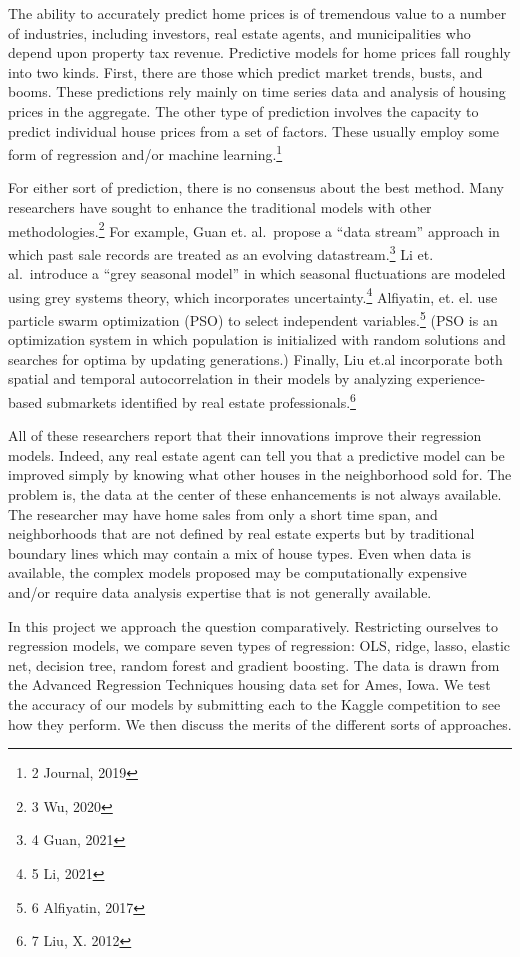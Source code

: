 \documentclass[
]{article}
\begin{document}
The ability to accurately predict home prices is of tremendous value to
a number of industries, including investors, real estate agents, and
municipalities who depend upon property tax revenue. Predictive models
for home prices fall roughly into two kinds. First, there are those
which predict market trends, busts, and booms. These predictions rely
mainly on time series data and analysis of housing prices in the
aggregate. The other type of prediction involves the capacity to predict
individual house prices from a set of factors. These usually employ some
form of regression and/or machine learning.\footnote{2 Journal, 2019}

For either sort of prediction, there is no consensus about the best
method. Many researchers have sought to enhance the traditional models
with other methodologies.\footnote{3 Wu, 2020} For example, Guan et.
al.~propose a ``data stream'' approach in which past sale records are
treated as an evolving datastream.\footnote{4 Guan, 2021} Li et.
al.~introduce a ``grey seasonal model'' in which seasonal fluctuations
are modeled using grey systems theory, which incorporates
uncertainty.\footnote{5 Li, 2021} Alfiyatin, et. el. use particle swarm
optimization (PSO) to select independent variables.\footnote{6
  Alfiyatin, 2017} (PSO is an optimization system in which population is
initialized with random solutions and searches for optima by updating
generations.) Finally, Liu et.al incorporate both spatial and temporal
autocorrelation in their models by analyzing experience-based submarkets
identified by real estate professionals.\footnote{7 Liu, X. 2012}

All of these researchers report that their innovations improve their
regression models. Indeed, any real estate agent can tell you that a
predictive model can be improved simply by knowing what other houses in
the neighborhood sold for. The problem is, the data at the center of
these enhancements is not always available. The researcher may have home
sales from only a short time span, and neighborhoods that are not
defined by real estate experts but by traditional boundary lines which
may contain a mix of house types. Even when data is available, the
complex models proposed may be computationally expensive and/or require
data analysis expertise that is not generally available.

In this project we approach the question comparatively. Restricting
ourselves to regression models, we compare seven types of regression:
OLS, ridge, lasso, elastic net, decision tree, random forest and
gradient boosting. The data is drawn from the Advanced Regression
Techniques housing data set for Ames, Iowa. We test the accuracy of our
models by submitting each to the Kaggle competition to see how they
perform. We then discuss the merits of the different sorts of
approaches.
\end{document}

